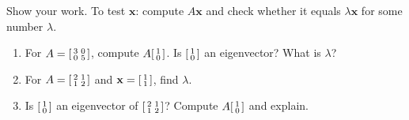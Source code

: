 \documentclass[10pt]{article}
\newcommand{\xx}{\mathbf{x}}
\begin{document}
\begin{practicebox}
Show your work. To test $\xx$: compute $A\xx$ and check whether it equals $\lambda\xx$ for some number $\lambda$.
\begin{enumerate}[leftmargin=1.6em, itemsep=4pt]
  \item For $A=\begin{bsmallmatrix} 3 & 0\\ 0 & 5 \end{bsmallmatrix}$, compute $A\begin{bsmallmatrix} 1\\ 0 \end{bsmallmatrix}$. Is $\begin{bsmallmatrix} 1\\ 0 \end{bsmallmatrix}$ an eigenvector? What is $\lambda$? \writeline
  \item For $A=\begin{bsmallmatrix} 2 & 1\\ 1 & 2 \end{bsmallmatrix}$ and $\xx=\begin{bsmallmatrix} 1\\ 1 \end{bsmallmatrix}$, find $\lambda$. \writeline
  \item Is $\begin{bsmallmatrix} 1\\ 0 \end{bsmallmatrix}$ an eigenvector of $\begin{bsmallmatrix} 2 & 1\\ 1 & 2 \end{bsmallmatrix}$? Compute $A\begin{bsmallmatrix} 1\\ 0 \end{bsmallmatrix}$ and explain. \writeline
\end{enumerate}
\end{practicebox}
\end{document}
